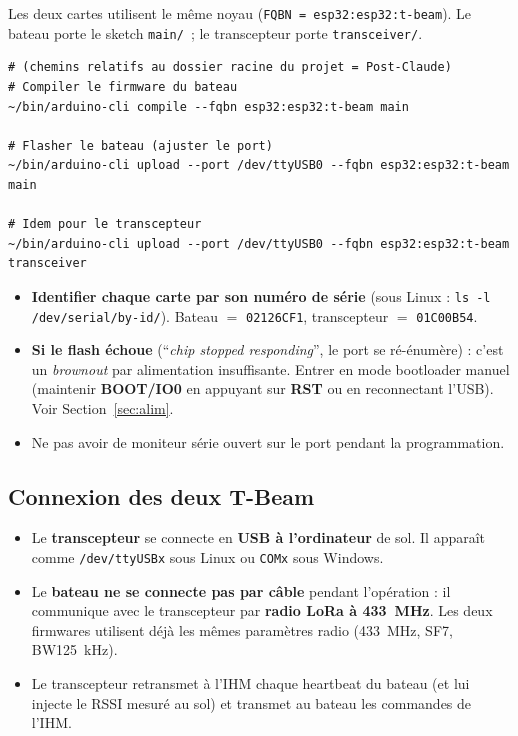 \documentclass[12pt,a4paper]{article}
\newcommand{\file}[1]{\texttt{#1}}
\begin{document}
Les deux cartes utilisent le m\^eme noyau (\texttt{FQBN = esp32:esp32:t-beam}). Le
bateau porte le sketch \file{main/}~; le transcepteur porte \file{transceiver/}.

\begin{lstlisting}[style=shell, caption={Compiler et flasher avec arduino-cli}]
# (chemins relatifs au dossier racine du projet = Post-Claude)
# Compiler le firmware du bateau
~/bin/arduino-cli compile --fqbn esp32:esp32:t-beam main

# Flasher le bateau (ajuster le port)
~/bin/arduino-cli upload --port /dev/ttyUSB0 --fqbn esp32:esp32:t-beam main

# Idem pour le transcepteur
~/bin/arduino-cli upload --port /dev/ttyUSB0 --fqbn esp32:esp32:t-beam transceiver
\end{lstlisting}

\begin{itemize}
  \item \textbf{Identifier chaque carte par son num\'ero de s\'erie} (sous Linux :
    \texttt{ls -l /dev/serial/by-id/}). Bateau $=$ \texttt{02126CF1},
    transcepteur $=$ \texttt{01C00B54}.
  \item \textbf{Si le flash \'echoue} (``\emph{chip stopped responding}'', le port se
    r\'e-\'enum\`ere) : c'est un \emph{brownout} par alimentation insuffisante. Entrer
    en mode bootloader manuel (maintenir \textbf{BOOT/IO0} en appuyant sur
    \textbf{RST} ou en reconnectant l'USB). Voir Section~\ref{sec:alim}.
  \item Ne pas avoir de moniteur s\'erie ouvert sur le port pendant la programmation.
\end{itemize}

\subsection{Connexion des deux T-Beam}

\begin{itemize}
  \item Le \textbf{transcepteur} se connecte en \textbf{USB à l'ordinateur} de sol.
    Il appara\^it comme \texttt{/dev/ttyUSBx} sous Linux ou \texttt{COMx} sous Windows.
  \item Le \textbf{bateau ne se connecte pas par c\^able} pendant l'op\'eration : il
    communique avec le transcepteur par \textbf{radio LoRa à 433~MHz}. Les deux
    firmwares utilisent d\'ej\`a les m\^emes param\`etres radio (433~MHz, SF7,
    BW125~kHz).
  \item Le transcepteur retransmet à l'IHM chaque heartbeat du bateau (et lui injecte
    le RSSI mesur\'e au sol) et transmet au bateau les commandes de l'IHM.
\end{itemize}
\end{document}
